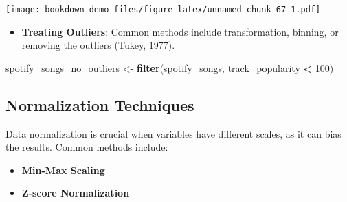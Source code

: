 \documentclass[
  b5paper]{book}
\newenvironment{Shaded}{\begin{snugshade}}{\end{snugshade}}
\newcommand{\DecValTok}[1]{\textcolor[rgb]{0.00,0.00,0.81}{#1}}
\newcommand{\FunctionTok}[1]{\textcolor[rgb]{0.13,0.29,0.53}{\textbf{#1}}}
\newcommand{\NormalTok}[1]{#1}
\newcommand{\OtherTok}[1]{\textcolor[rgb]{0.56,0.35,0.01}{#1}}
\newcommand{\SpecialCharTok}[1]{\textcolor[rgb]{0.81,0.36,0.00}{\textbf{#1}}}
\providecommand{\tightlist}{%
  \setlength{\itemsep}{0pt}\setlength{\parskip}{0pt}}
\begin{document}
\texttt{[image: bookdown-demo\_files/figure-latex/unnamed-chunk-67-1.pdf]}

\begin{itemize}
\tightlist
\item
  \textbf{Treating Outliers}: Common methods include transformation, binning, or removing the outliers (Tukey, 1977).
\end{itemize}

\begin{Shaded}
\begin{Highlighting}[]
\NormalTok{spotify\_songs\_no\_outliers }\OtherTok{\textless{}{-}} \FunctionTok{filter}\NormalTok{(spotify\_songs, track\_popularity }\SpecialCharTok{\textless{}} \DecValTok{100}\NormalTok{)}
\end{Highlighting}
\end{Shaded}

\hypertarget{normalization-techniques}{%
\subsection*{Normalization Techniques}\label{normalization-techniques}}

Data normalization is crucial when variables have different scales, as it can bias the results. Common methods include:

\begin{itemize}
\tightlist
\item
  \textbf{Min-Max Scaling}
\end{itemize}

\begin{Shaded}
\end{Shaded}

\begin{itemize}
\tightlist
\item
  \textbf{Z-score Normalization}
\end{itemize}
\end{document}
